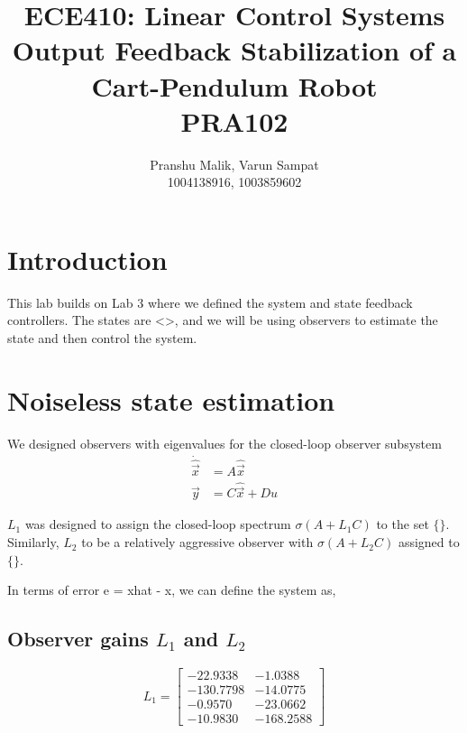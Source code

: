 \documentclass[10pt]{article}
\date{}
\begin{document}
\title{\textbf{\Large{\textsc{ECE410:} Linear Control Systems}} \\ \Large{Output Feedback Stabilization of a Cart-Pendulum Robot} \\ \textbf{\small{PRA102}}\vspace{-0.3cm}}
\author{Pranshu Malik, Varun Sampat \\ \footnotesize{1004138916}, \footnotesize{1003859602}\vspace{-3cm}}

\maketitle

\section{Introduction}
This lab builds on Lab 3 where we defined the system and state feedback controllers. The states are <>, and we will be using observers to estimate the state and then control the system.

\section{Noiseless state estimation}

We designed observers with eigenvalues for the closed-loop observer subsystem
\begin{align*}
    \dot{\hat{\vec{x}}} &= A\hat{\vec{x}}\\
    \vec{y} &= C\hat{\vec{x}} + Du
\end{align*}

$L_1$ was designed to assign the closed-loop spectrum $\sigma(A+L_1C)$ to the set $\{\}$. Similarly, $L_2$ to be a relatively aggressive observer with $\sigma(A+L_2C)$ assigned to $\{\}$.

In terms of error e = xhat - x, we can define the system as,

\subsection{Observer gains \texorpdfstring{$L_1$}{L1} and \texorpdfstring{$L_2$}{L2}}

\begin{equation*}
    L_1 = \begin{bmatrix}
    -22.9338 & -1.0388 \\
    -130.7798 & -14.0775 \\ 
    -0.9570 & -23.0662 \\ 
    -10.9830 & -168.2588
    \end{bmatrix}
\end{equation*}
\end{document}
